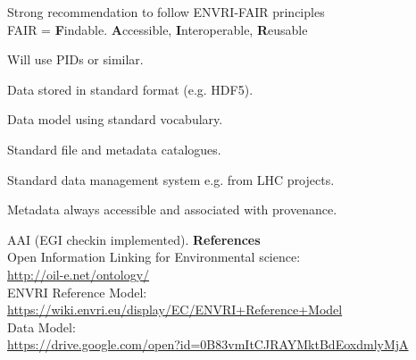 \begin{frame}[fragile,t]
  \vspace{\mytopbit}
  {Strong recommendation to follow ENVRI-FAIR principles \\ }
FAIR = {\bf F}indable. {\bf A}ccessible, {\bf I}nteroperable, {\bf R}eusable
\bitm
\item Will use PIDs or similar.
\item Data stored in standard format (e.g. HDF5).
\item Data model using standard vocabulary.
\item Standard file and metadata catalogues.
\item Standard data management system e.g. from LHC projects.
\item Metadata always accessible and associated with provenance.
\item AAI (EGI checkin implemented).
\eitm
{\bf References \\}
{Open Information Linking for Environmental science:} \\
{\scriptsize \url{http://oil-e.net/ontology/}} \\
{ENVRI Reference Model:} \\
{\scriptsize \url{https://wiki.envri.eu/display/EC/ENVRI+Reference+Model}} \\
{\ED Data Model:} \\
{\scriptsize \url{https://drive.google.com/open?id=0B83vmItCJRAYMktBdEoxdmlyMjA}}
\end{frame}

